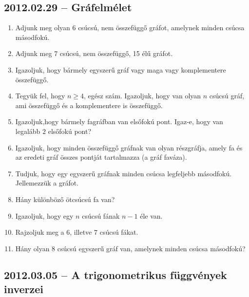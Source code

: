 \documentclass{article}
\begin{document}
\subsection*{2012.02.29 -- Gráfelmélet}
\begin{enumerate}
\item Adjunk meg olyan $6$ csúcsú, nem összefüggő gráfot, amelynek minden csúcsa másodfokú.

\item Adjunk meg  7 csúcsú, nem összefüggő, 15 élű gráfot.

\item Igazoljuk, hogy bármely egyszerű gráf vagy maga vagy komplementere összefüggő.

\item Tegyük fel, hogy $n\geq 4$, egész szám. Igazoljuk, hogy van olyan $n$ csúcsú gráf, ami összefüggő és a komplementere is összefüggő.

\item Igazoljuk,hogy bármely fagráfban van elsőfokú pont. Igaz-e, hogy van legalább $2$ elsőfokú pont?

\item Igazoljuk, hogy minden összefüggő gráfnak van olyan részgráfja, amely fa és az eredeti gráf összes pontját tartalmazza (a gráf faváza).

\item Tudjuk, hogy egy egyszerű gráfnak minden csúcsa legfeljebb másodfokú. Jellemezzük a gráfot.

\item Hány különböző  ötcsúcsú fa van?

\item Igazoljuk, hogy egy $n$ csúcsú fának $n-1$ éle van.

\item Rajzoljuk meg a $6$, illetve $7$ csúcsú fákat.

\item Hány olyan $8$ csúcsú egyszerű gráf van, amelynek minden csúcsa másodfokú?

\end{enumerate}


\subsection*{2012.03.05 -- A trigonometrikus függvények inverzei}
\end{document}
